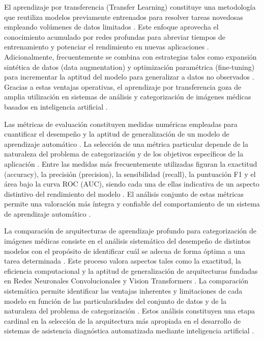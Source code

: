 El aprendizaje por transferencia (Transfer Learning) constituye una metodología que reutiliza modelos previamente entrenados para resolver tareas novedosas empleando volúmenes de datos limitados \cite{ref39}. Este enfoque aprovecha el conocimiento acumulado por redes profundas para abreviar tiempos de entrenamiento y potenciar el rendimiento en nuevas aplicaciones \cite{ref39}. Adicionalmente, frecuentemente se combina con estrategias tales como expansión sintética de datos (data augmentation) y optimización paramétrica (fine-tuning) para incrementar la aptitud del modelo para generalizar a datos no observados \cite{ref39}. Gracias a estas ventajas operativas, el aprendizaje por transferencia goza de amplia utilización en sistemas de análisis y categorización de imágenes médicas basados en inteligencia artificial \cite{ref39}.

Las métricas de evaluación constituyen medidas numéricas empleadas para cuantificar el desempeño y la aptitud de generalización de un modelo de aprendizaje automático \cite{ref40}. La selección de una métrica particular depende de la naturaleza del problema de categorización y de los objetivos específicos de la aplicación \cite{ref40}. Entre las medidas más frecuentemente utilizadas figuran la exactitud (accuracy), la precisión (precision), la sensibilidad (recall), la puntuación F1 y el área bajo la curva ROC (AUC), siendo cada una de ellas indicativa de un aspecto distintivo del rendimiento del modelo \cite{ref40}. El análisis conjunto de estas métricas permite una valoración más íntegra y confiable del comportamiento de un sistema de aprendizaje automático \cite{ref40}.

La comparación de arquitecturas de aprendizaje profundo para categorización de imágenes médicas consiste en el análisis sistemático del desempeño de distintos modelos con el propósito de identificar cuál se adecua de forma óptima a una tarea determinada \cite{ref41}. Este proceso valora aspectos tales como la exactitud, la eficiencia computacional y la aptitud de generalización de arquitecturas fundadas en Redes Neuronales Convolucionales y Vision Transformers \cite{ref41}. La comparación sistemática permite identificar las ventajas inherentes y limitaciones de cada modelo en función de las particularidades del conjunto de datos y de la naturaleza del problema de categorización \cite{ref41}. Estos análisis constituyen una etapa cardinal en la selección de la arquitectura más apropiada en el desarrollo de sistemas de asistencia diagnóstica automatizada mediante inteligencia artificial \cite{ref41}.
